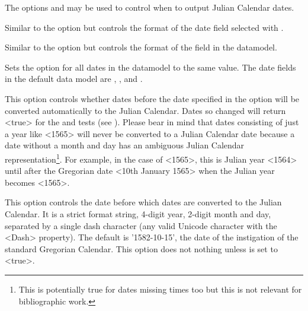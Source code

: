 \documentclass{ltxdockit}[2011/03/25]
\begin{document}
\begin{optionlist}
The options  and   may be used to control when to output Julian Calendar dates.


Similar to the  option but controls the format of the date field selected with .


Similar to the  option but controls the format of the  field in the datamodel.


Sets the option for all dates in the datamodel to the same value. The date fields in the default data model are , ,  and .


This option controls whether dates before the date specified in the  option will be converted automatically to the Julian Calendar. Dates so changed will return <true> for the  and  tests (see ). Please bear in mind that dates consisting of just a year like <1565> will never be converted to a Julian Calendar date because a date without a month and day has an ambiguous Julian Calendar representation\footnote{This is potentially true for dates missing times too but this is not relevant for bibliographic work.}. For example, in the case of <1565>, this is Julian year <1564> until after the Gregorian date <10th January 1565> when the Julian year becomes <1565>.


This option controls the date before which dates are converted to the Julian Calendar. It is a strict format string, 4-digit year, 2-digit month and day, separated by a single dash character (any valid Unicode character with the <Dash> property). The default is '1582-10-15', the date of the instigation of the standard Gregorian Calendar. This option does not nothing unless  is set to <true>.



\end{optionlist}
\end{document}
